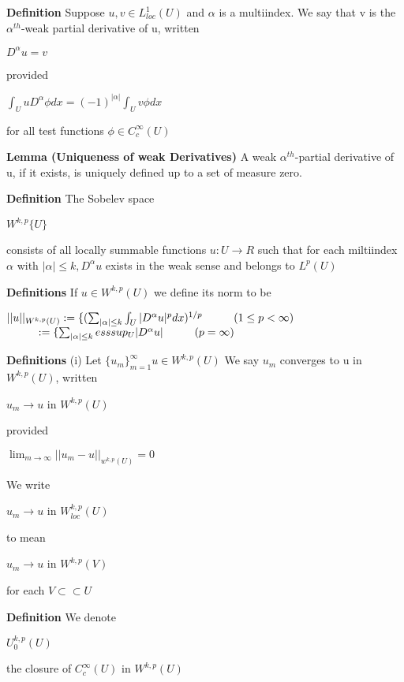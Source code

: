 \documentclass{article}
\newcommand\tab[1][1cm]{\hspace*{#1}}
\begin{document}
\textbf {Definition} Suppose $u, v \in L^{1}_{loc} (U)$ and $\alpha$ is a multiindex. We say that v is the $\alpha^{th}$-weak partial derivative of u, written
\begin{center}
$D^{\alpha}u = v$
\end{center}
provided
\begin{center}
$\int_U uD^{\alpha} \phi dx = (-1)^{|\alpha|} \int_U v \phi dx$
\end{center}
for all test functions $\phi \in C_c^{\infty} (U)$

\textbf {Lemma (Uniqueness of weak Derivatives)} A weak $\alpha^{th}$-partial derivative of u, if it exists, is uniquely defined up to a set of measure zero.

\textbf {Definition} The Sobelev space
\begin{center}
$W^{k,p} \{U\}$
\end{center}
consists of all locally summable functions $u: U \to R$ such that for each miltiindex $\alpha$ with $|\alpha| \leq k, D^{\alpha} u$ exists in the weak sense and belongs to $L^{p}(U)$

\textbf {Definitions} If $u \in W^{k, p} (U)$ we define its norm to be 
\begin{center}
$||u||_{W^{k,p}(U)} := \{ (\sum_{|\alpha| \leq k} \int_U |D^{\alpha} u |^p dx)^{1/p} \tab (1 \leq p < \infty)$ \\
$ \tab := \{ \sum_{|\alpha| \leq k} ess sup_U |D^{\alpha} u| \tab (p = \infty)$
\end{center}

\textbf {Definitions} (i) Let $\{u_m\}_{m=1}^\infty u \in W^{k,p} (U)$ We say $u_m$ converges to u in $W^{k,p}(U)$, written
\begin{center}
$u_m \to u$ \tab in $W^{k,p}(U)$
\end{center}
provided
\begin{center}
$\lim_{m \to \infty} ||u_m - u||_{w^{k,p}(U)} = 0$
\end{center}
We write
\begin{center}
$u_m \to u$ \tab in $W_{loc}^{k,p}(U)$
\end{center}
to mean
\begin{center}
$u_m \to u$ \tab in $W^{k,p}(V)$
\end{center}
for each $V \subset \subset U$

\textbf {Definition} We denote
\begin{center}
$U_0^{k,p}(U)$
\end{center}
the closure of $C_c^{\infty}(U)$ in $W^{k,p}(U)$
\end{document}
